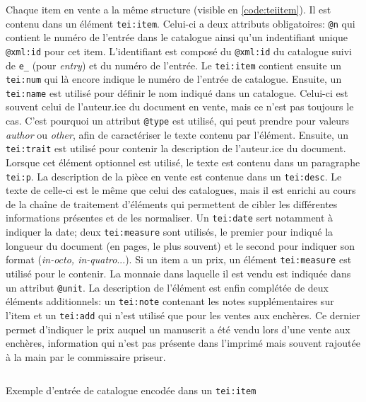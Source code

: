 Chaque item en vente a la même structure (visible en \ref{code:teiitem}). Il est contenu dans un élément \texttt{tei:item}. Celui-ci a deux attributs obligatoires: \texttt{@n} qui contient le numéro de l'entrée dans le catalogue ainsi qu'un indentifiant unique \texttt{@xml:id} pour cet item. L'identifiant est composé du \texttt{@xml:id} du catalogue suivi de \texttt{e\_} (pour \textit{entry}) et du numéro de l'entrée. Le \texttt{tei:item} contient ensuite un \texttt{tei:num} qui là encore indique le numéro de l'entrée de catalogue. Ensuite, un \texttt{tei:name} est utilisé pour définir le nom indiqué dans un catalogue. Celui-ci est souvent celui de l'auteur.ice du document en vente, mais ce n'est pas toujours le cas. C'est pourquoi un attribut \texttt{@type} est utilisé, qui peut prendre pour valeurs \textit{author} ou \textit{other}, afin de caractériser le texte contenu par l'élément. Ensuite, un \texttt{tei:trait} est utilisé pour contenir la description de l'auteur.ice du document. Lorsque cet élément optionnel est utilisé, le texte est contenu dans un paragraphe \texttt{tei:p}. La description de la pièce en vente est contenue dans un \texttt{tei:desc}. Le texte de celle-ci est le même que celui des catalogues, mais il est enrichi au cours de la chaîne de traitement d'éléments qui permettent de cibler les différentes informations présentes et de les normaliser. Un \texttt{tei:date} sert notamment à indiquer la date; deux \texttt{tei:measure} sont utilisés, le premier pour indiqué la longueur du document (en pages, le plus souvent) et le second pour indiquer son format (\textit{in-octo, in-quatro}...). Si un item a un prix, un élément \texttt{tei:measure} est utilisé pour le contenir. La monnaie dans laquelle il est vendu est indiquée dans un attribut \texttt{@unit}. La description de l'élément est enfin complétée de deux éléments additionnels: un \texttt{tei:note} contenant les notes supplémentaires sur l'item et un \texttt{tei:add} qui n'est utilisé que pour les ventes aux enchères. Ce dernier permet d'indiquer le prix auquel un manuscrit a été vendu lors d'une vente aux enchères, information qui n'est pas présente dans l'imprimé mais souvent rajoutée à la main par le commissaire priseur.

\begin{listing}[h]
	\inputminted{xml}{code/tei_item.xml}
	\caption{Exemple d'entrée de catalogue encodée dans un \texttt{tei:item}}
	\label{code:teiitem}
\end{listing}


